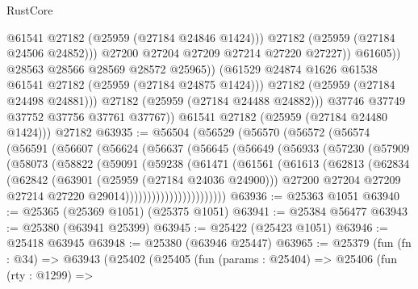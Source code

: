 \begin{lexlean}{RustCore}
\begin{coremodule}
                              @61541
                              @27182
                              (@25959 (@27184 @24846 @1424)))
                            @27182
                            (@25959 (@27184 @24506 @24852)))
                          @27200
                          @27204
                          @27209
                          @27214
                          @27220
                          @27227))
                      @61605))
                  @28563
                  @28566
                  @28569
                  @28572
                  @25965))
              (@61529 @24874 @1626 @61538 @61541 @27182 (@25959 (@27184 @24875 @1424)))
              @27182
              (@25959 (@27184 @24498 @24881)))
            @27182
            (@25959 (@27184 @24488 @24882)))
          @37746
          @37749
          @37752
          @37756
          @37761
          @37767))
      @61541
      @27182
      (@25959 (@27184 @24480 @1424)))
    @27182
@63935 := @56504
    (@56529
      (@56570
        (@56572
          (@56574
            (@56591
              (@56607
                (@56624
                  (@56637
                    (@56645
                      (@56649
                        (@56933
                          (@57230
                            (@57909
                              (@58073
                                (@58822
                                  (@59091
                                    (@59238
                                      (@61471
                                        (@61561
                                          (@61613
                                            (@62813
                                              (@62834
                                                (@62842
                                                  (@63901 (@25959 (@27184 @24036 @24900)))
                                                  @27200
                                                  @27204
                                                  @27209
                                                  @27214
                                                  @27220
                                                  @29014)))))))))))))))))))))))
@63936 := @25363 @1051
@63940 := @25365 (@25369 @1051) (@25375 @1051)
@63941 := @25384 @56477
@63943 := @25380 (@63941 @25399)
@63945 := @25422 (@25423 @1051)
@63946 := @25418 @63945
@63948 := @25380 (@63946 @25447)
@63965 := @25379
    (fun (fn : @34) =>
    @63943
      (@25402
        (@25405
          (fun (params : @25404) =>
          @25406
            (fun (rty : @1299) =>

\end{coremodule}
\end{lexlean}
